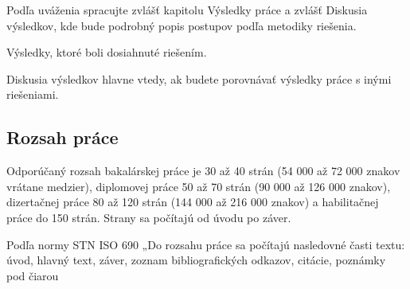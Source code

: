 Podľa uváženia spracujte zvlášť kapitolu Výsledky práce a zvlášť Diskusia výsledkov, kde bude podrobný popis postupov podľa metodiky riešenia.

Výsledky, ktoré boli dosiahnuté riešením.

Diskusia výsledkov hlavne vtedy, ak budete porovnávať výsledky práce s inými riešeniami.

\subsection{Rozsah práce}

Odporúčaný rozsah bakalárskej práce je 30 až 40 strán (54 000 až 72 000 znakov vrátane medzier), diplomovej práce 50 až 70 strán (90 000 až 126 000 znakov), dizertačnej práce 80 až 120 strán (144 000 až 216 000 znakov) a habilitačnej práce do 150 strán. Strany sa počítajú od úvodu po záver. 


Podľa normy STN ISO 690 „Do rozsahu práce sa počítajú nasledovné časti textu: úvod, hlavný text, záver, zoznam bibliografických odkazov, citácie, poznámky pod čiarou